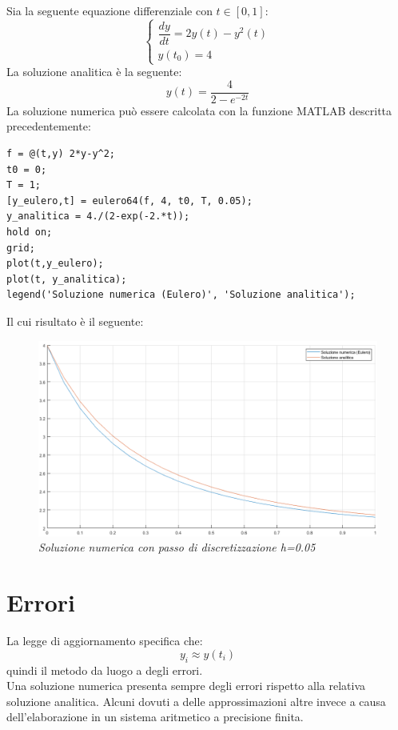 \begin{example}
	Sia la seguente equazione differenziale	con $t \in [0,1]$:
	\begin{equation*}
		\begin{cases}
			\dfrac{dy}{dt} = 2y(t)-y^2(t) \\[0.2cm]
			y(t_{0}) = 4
		\end{cases}
	\end{equation*}
	La soluzione analitica è la seguente:
	\begin{equation*}
		y(t) = \dfrac{4}{2-e^{-2t}}
	\end{equation*}
	La soluzione numerica può essere calcolata con la funzione MATLAB descritta precedentemente:
	\begin{verbatim}
f = @(t,y) 2*y-y^2;
t0 = 0;
T = 1;
[y_eulero,t] = eulero64(f, 4, t0, T, 0.05);
y_analitica = 4./(2-exp(-2.*t));
hold on;
grid;
plot(t,y_eulero);
plot(t, y_analitica);
legend('Soluzione numerica (Eulero)', 'Soluzione analitica');
	\end{verbatim}
Il cui risultato è il seguente:
\begin{figure}[H]
	\centering
	\includegraphics[width=\textwidth]{matlab/esempio1_eulero.png}
	\caption{\textit{Soluzione numerica con passo di discretizzazione h=0.05}}
\end{figure}
\end{example}

\section{Errori}
La legge di aggiornamento specifica che:
\begin{equation*}
	y_i \approx y(t_i)
\end{equation*}
quindi il metodo da luogo a degli errori.
\\Una soluzione numerica presenta sempre degli errori rispetto alla relativa soluzione analitica. Alcuni dovuti a delle approssimazioni altre invece a causa dell'elaborazione in un sistema aritmetico a precisione finita.




